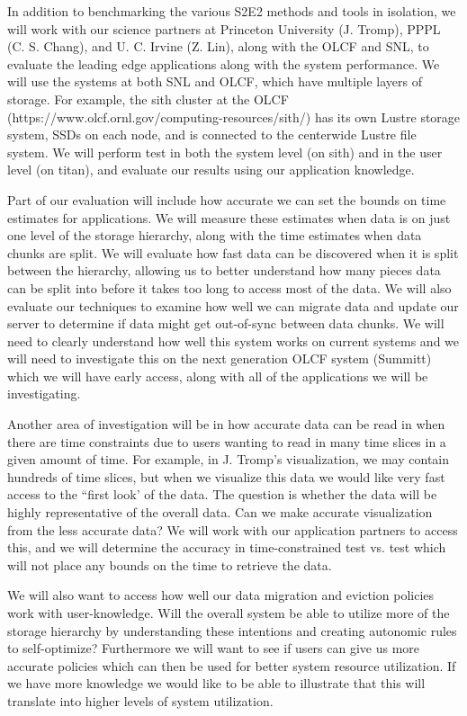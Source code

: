 In addition to benchmarking the various S2E2 methods and tools in isolation, we will work with our science partners at
Princeton University (J. Tromp), PPPL (C. S. Chang), and U. C. Irvine (Z. Lin), along with the OLCF  and SNL, to evaluate the 
leading edge applications along with the system performance. We will use the systems at both SNL and OLCF, which have 
multiple layers of storage. For example, the sith cluster at the OLCF (https://www.olcf.ornl.gov/computing-resources/sith/) 
has its own Lustre storage system, SSDs on each node, and is connected to the centerwide Lustre file system. We will perform 
test in both the system level (on sith) and in the user level (on titan), and evaluate our results using our application knowledge.

Part of our evaluation will include how accurate we can set the bounds on time estimates for applications. We will measure these
estimates when data is on just one level of the storage hierarchy, along with the time estimates when data chunks are split. We 
will evaluate how fast data can be discovered when it is split between the hierarchy, allowing us to better understand how many 
pieces data can be split into before it takes too long to access most of the data.  We will also evaluate our techniques to examine
how well we can migrate data and update our server to determine if data might get out-of-sync between data chunks. We will
need to clearly understand how well this system works on current systems and we will need to investigate this on the next generation
OLCF system (Summitt) which we will have early access, along with all of the applications we will be investigating.

Another area of investigation will be in how accurate data can be read in when there are time constraints due to users wanting
to read in many time slices in a given amount of time. For example, in J. Tromp's visualization, we may contain hundreds of time
slices, but when we visualize this data we would like very fast access to the ``first look' of the data. The question is whether the data
will be highly representative of the overall data. Can we make accurate visualization from the less accurate data?  We will work
with our application partners to access this, and we will determine the accuracy in time-constrained test vs. test which will not 
place any bounds on the time to retrieve the data.

We will also want to access how well our data migration and eviction policies work with user-knowledge. Will the overall system
be able to utilize more of the storage hierarchy by understanding these intentions and creating autonomic rules to self-optimize?
Furthermore we will want to see if users can give us more accurate policies which can then be used for better system resource
utilization. If we have more knowledge we would like to be able to illustrate that this will translate into higher levels of system
utilization.

